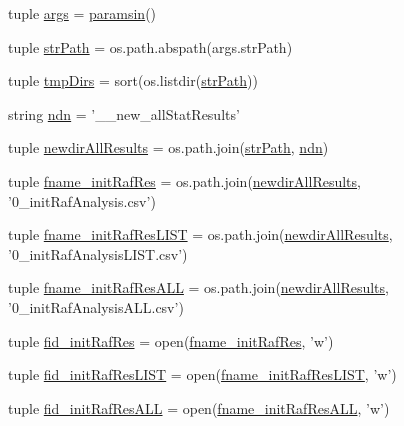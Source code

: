\begin{DoxyCompactItemize}
\item 
tuple \hyperlink{a00103_a56a89c268db9387680d2afc8d00af322}{args} = \hyperlink{a00103_a4f1cb8cacda7a862100a91f2bba21b49}{paramsin}()
\item 
tuple \hyperlink{a00103_afcc190cd479c93d1f2442b3214b0765d}{str\-Path} = os.\-path.\-abspath(args.\-str\-Path)
\item 
tuple \hyperlink{a00103_a16a858871fb81c4d23fa4bb57a438b6d}{tmp\-Dirs} = sort(os.\-listdir(\hyperlink{a00103_afcc190cd479c93d1f2442b3214b0765d}{str\-Path}))
\item 
string \hyperlink{a00103_a47102719cd6e664cce6fa7202e3982b1}{ndn} = '\-\_\-\_\-new\-\_\-all\-Stat\-Results'
\item 
tuple \hyperlink{a00103_a4e302e188faffc99286c6c7b38cbf1f8}{newdir\-All\-Results} = os.\-path.\-join(\hyperlink{a00103_afcc190cd479c93d1f2442b3214b0765d}{str\-Path}, \hyperlink{a00103_a47102719cd6e664cce6fa7202e3982b1}{ndn})
\item 
tuple \hyperlink{a00103_ae61b55457549e0a6028d8933d0b31d00}{fname\-\_\-init\-Raf\-Res} = os.\-path.\-join(\hyperlink{a00103_a4e302e188faffc99286c6c7b38cbf1f8}{newdir\-All\-Results}, '0\-\_\-init\-Raf\-Analysis.\-csv')
\item 
tuple \hyperlink{a00103_a5f7aa907185951a89bae40e384167bff}{fname\-\_\-init\-Raf\-Res\-L\-I\-S\-T} = os.\-path.\-join(\hyperlink{a00103_a4e302e188faffc99286c6c7b38cbf1f8}{newdir\-All\-Results}, '0\-\_\-init\-Raf\-Analysis\-L\-I\-S\-T.\-csv')
\item 
tuple \hyperlink{a00103_a950ae7a4f866dc7a17dd7ba635e0d2cd}{fname\-\_\-init\-Raf\-Res\-A\-L\-L} = os.\-path.\-join(\hyperlink{a00103_a4e302e188faffc99286c6c7b38cbf1f8}{newdir\-All\-Results}, '0\-\_\-init\-Raf\-Analysis\-A\-L\-L.\-csv')
\item 
tuple \hyperlink{a00103_a258139f61b00fd46cde4a1efe7867c64}{fid\-\_\-init\-Raf\-Res} = open(\hyperlink{a00103_ae61b55457549e0a6028d8933d0b31d00}{fname\-\_\-init\-Raf\-Res}, 'w')
\item 
tuple \hyperlink{a00103_a1e29abad83e5d8e79fda248ea0404d66}{fid\-\_\-init\-Raf\-Res\-L\-I\-S\-T} = open(\hyperlink{a00103_a5f7aa907185951a89bae40e384167bff}{fname\-\_\-init\-Raf\-Res\-L\-I\-S\-T}, 'w')
\item 
tuple \hyperlink{a00103_a8145e32e6c235cd8bfb404f137ec233e}{fid\-\_\-init\-Raf\-Res\-A\-L\-L} = open(\hyperlink{a00103_a950ae7a4f866dc7a17dd7ba635e0d2cd}{fname\-\_\-init\-Raf\-Res\-A\-L\-L}, 'w')
\item 

\end{DoxyCompactItemize}

